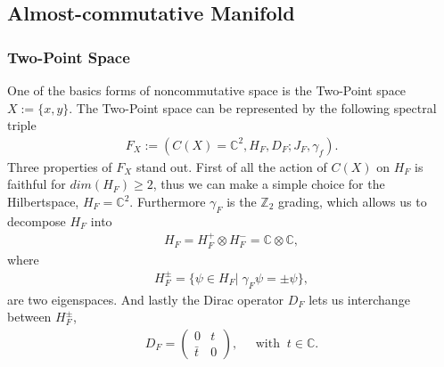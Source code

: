 \subsection{Almost-commutative Manifold}
\subsubsection{Two-Point Space}
One of the basics forms of noncommutative space is the Two-Point space $X
:= \{x, y\}$. The Two-Point space can be represented by the following spectral triple
\begin{align}
    F_X := (C(X) = \mathbb{C}^2, H_F, D_F; J_F, \gamma _f).
\end{align}
Three properties of $F_X$ stand out. First of all the action of
$C(X)$ on $H_F$ is faithful for $dim(H_F) \geq 2$, thus we can make a simple
choice for the Hilbertspace, $H_F = \mathbb{C}^2$. Furthermore $\gamma_F$ is
the $\mathbb{Z}_2$ grading, which allows us to decompose $H_F$ into
\begin{align}
   H_F = H_F^+ \otimes H_F^- = \mathbb{C} \otimes \mathbb{C},
\end{align}
where
\begin{align}
    H_F^\pm = \{\psi \in H_F |\; \gamma_F\psi = \pm \psi\},
\end{align}
are two eigenspaces. And lastly the Dirac operator $D_F$ lets us
interchange between $H_F^\pm$,
\begin{align}
    D_F =
        \begin{pmatrix}0 & t \\ \bar{t} & 0\end{pmatrix},  \;\;\;\;\;
            \text{with} \;\; t\in\mathbb{C}.
\end{align}

